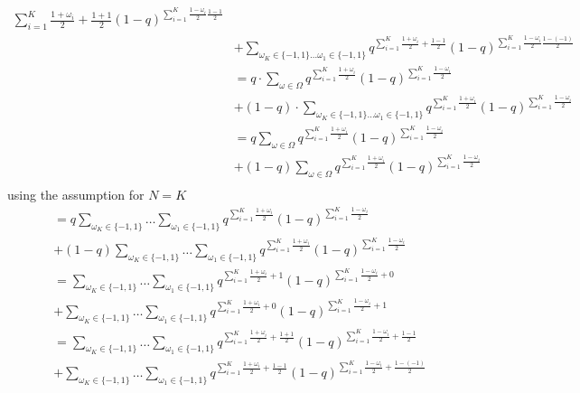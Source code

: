 \begin{enumerate}
\begin{align*}
{\sum_{i=1}^{K}\frac{1+ \omega_{i} }{2} + \frac{1+1}{2}  } (1-q)^{ \sum_{i=1}^{K} \frac{1-\omega_{i}}{2}
\frac{1-1}{2} } \\
&+  \sum_{\omega_{K} \in \{ -1,1 \} \dots \omega_{1} \in \{ -1,1 \}  }^{} q^{
\sum_{i=1}^{K}\frac{1+ \omega_{i} }{2} + \frac{1-1}{2}  } (1-q)^{ \sum_{i=1}^{K} \frac{1-\omega_{i}}{2}
\frac{1-(-1)}{2} } \\
&= q \cdot \sum_{\omega \in \Omega }^{} q^{\sum_{i=1}^{K}\frac{1+ \omega_{i} }{2}} (1-q)^{ \sum_{i=1}^{K} \frac{1-\omega_{i}}{2}} \\
&+ (1-q) \cdot \sum_{\omega_{K} \in \{ -1,1 \} \dots \omega_{1} \in \{ -1,1 \}  }^{} q^{
\sum_{i=1}^{K}\frac{1+ \omega_{i} }{2}} (1-q)^{ \sum_{i=1}^{K} \frac{1-\omega_{i}}{2}} \\
&= q\sum_{\omega \in \Omega}^{} q^{\sum_{i=1}^{K}\frac{1+ \omega_{i} }{2}} (1-q)^{ \sum_{i=1}^{K} \frac{1-\omega_{i}}{2}} \\
&+ (1-q) \sum_{\omega \in \Omega}^{} q^{\sum_{i=1}^{K}\frac{1+ \omega_{i} }{2}} (1-q)^{
\sum_{i=1}^{K} \frac{1-\omega_{i}}{2}} \\
\end{align*}
using the assumption for $ N=K$
\begin{align*}
&= q\sum_{\omega_{K} \in \{ -1,1 \} }^{} \dots \sum_{\omega_{1}  \in \{
-1,1 \} }^{} q^{\sum_{i=1}^{K}\frac{1+ \omega_{i} }{2}} (1-q)^{
\sum_{i=1}^{K} \frac{1-\omega_{i}}{2}} \\
&+ (1-q) \sum_{\omega_{K} \in \{ -1,1 \} }^{} \dots \sum_{\omega_{1}  \in \{
-1,1 \} }^{} q^{\sum_{i=1}^{K}\frac{1+ \omega_{i} }{2}} (1-q)^{
\sum_{i=1}^{K} \frac{1-\omega_{i}}{2}} \\
&= \sum_{\omega_{K} \in \{ -1,1 \} }^{} \dots \sum_{\omega_{1}  \in \{
-1,1 \} }q^{
\sum_{i=1}^{K}\frac{1+ \omega_{i} }{2} + 1 } (1-q)^{ \sum_{i=1}^{K}
\frac{1-\omega_{i}}{2} + 0 } \\
&+ \sum_{\omega_{K} \in \{ -1,1 \} }^{} \dots \sum_{\omega_{1}  \in \{
-1,1 \} }q^{
\sum_{i=1}^{K}\frac{1+ \omega_{i} }{2} + 0 } (1-q)^{ \sum_{i=1}^{K}
\frac{1-\omega_{i}}{2}+ 1 } \\
&= \sum_{\omega_{K} \in \{ -1,1 \} }^{} \dots \sum_{\omega_{1}  \in \{
-1,1 \}} q^{\sum_{i=1}^{K}\frac{1+ \omega_{i} }{2} + \frac{1+1}{2}  } (1-q)^{ \sum_{i=1}^{K}\frac{1-\omega_{i}}{2} + \frac{1-1}{2}} \\
&+ \sum_{\omega_{K} \in \{ -1,1 \} }^{} \dots \sum_{\omega_{1}  \in \{
-1,1 \}} q^{\sum_{i=1}^{K}\frac{1+ \omega_{i} }{2} + \frac{1-1}{2}  } (1-q)^{ \sum_{i=1}^{K}\frac{1-\omega_{i}}{2} + \frac{1-(-1)}{2}} \\

\end{align*}
\end{enumerate}
